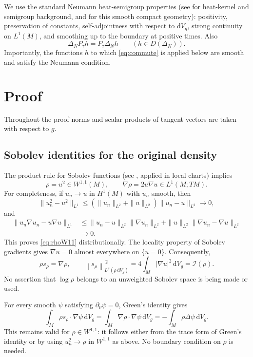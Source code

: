 \documentclass[11pt]{article}
\newcommand{\dd}{\,\mathrm{d}}
\newcommand{\dV}{\dd V_g}
\newcommand{\I}{\mathcal I}
\newcommand{\normrho}[1]{\left\lVert #1\right\rVert_{L^2(\rho\,\mathrm{d}V_g)}}
\begin{document}
We use the standard Neumann heat-semigroup properties (see \cite{Davies} for heat-kernel and semigroup background, and \cite[Section 3]{CFM} for this smooth compact geometry): positivity, preservation of constants, self-adjointness with respect to $\mathrm{d}V_g$, strong continuity on $L^1(M)$, and smoothing up to the boundary at positive times. Also
\begin{equation}\label{eq:commute}
 \Delta_N P_\tau h=P_\tau\Delta_N h\qquad (h\in D(\Delta_N)).
\end{equation}
Importantly, the functions $h$ to which \eqref{eq:commute} is applied below are smooth and satisfy the Neumann condition.

\section{Proof}
Throughout the proof norms and scalar products of tangent vectors are taken with respect to $g$.

\subsection{Sobolev identities for the original density}
The product rule for Sobolev functions (see \cite[Chapter 2]{Ziemer}, applied in local charts) implies
\begin{equation}\label{eq:rhoW11}
 \rho=u^2\in W^{1,1}(M),\qquad \nabla\rho=2u\nabla u\in L^1(M;TM).
\end{equation}
For completeness, if $u_n\to u$ in $H^1(M)$ with $u_n$ smooth, then
\[
 \|u_n^2-u^2\|_{L^1}
 \leq(\|u_n\|_{L^2}+\|u\|_{L^2})\|u_n-u\|_{L^2}\longrightarrow0,
\]
and
\begin{align*}
 \|u_n\nabla u_n-u\nabla u\|_{L^1}
 &\leq\|u_n-u\|_{L^2}\|\nabla u_n\|_{L^2}
       +\|u\|_{L^2}\|\nabla u_n-\nabla u\|_{L^2}\\
 &\longrightarrow0.
\end{align*}
This proves \eqref{eq:rhoW11} distributionally. The locality property of Sobolev gradients \cite[Chapter 2]{Ziemer} gives $\nabla u=0$ almost everywhere on $\{u=0\}$. Consequently,
\begin{equation}\label{eq:scoreidentity}
 \rho s_\rho=\nabla\rho,\qquad
 \normrho{s_\rho}^{\,2}=4\int_M|\nabla u|^2\dV=\I(\rho).
\end{equation}
No assertion that $\log\rho$ belongs to an unweighted Sobolev space is being made or used.

For every smooth $\psi$ satisfying $\partial_\nu\psi=0$, Green's identity gives
\begin{equation}\label{eq:weakgreen}
 \int_M\rho s_\rho\cdot\nabla\psi\dV
 =\int_M\nabla\rho\cdot\nabla\psi\dV
 =-\int_M\rho\Delta\psi\dV.
\end{equation}
This remains valid for $\rho\in W^{1,1}$: it follows either from the trace form of Green's identity or by using $u_n^2\to\rho$ in $W^{1,1}$ as above. No boundary condition on $\rho$ is needed.
\end{document}
